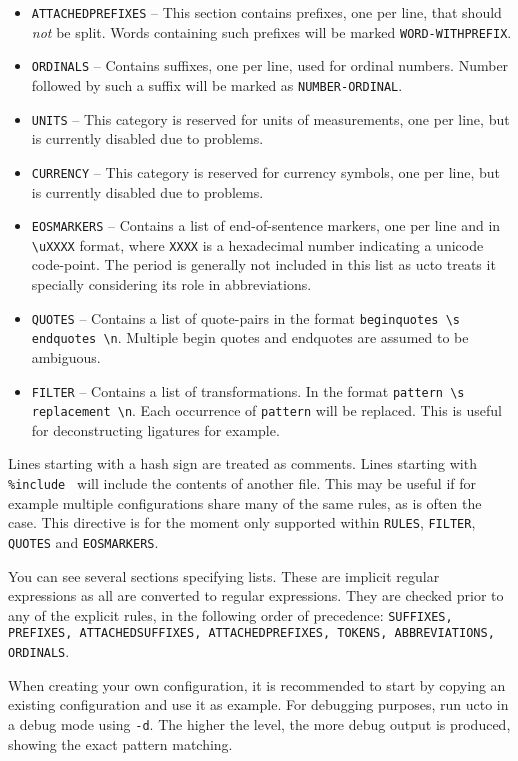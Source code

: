 \documentclass[a4paper,12pt]{report}
\begin{document}
\begin{itemize}
\item \texttt{ATTACHEDPREFIXES} -- This section contains prefixes, one per line, that should \emph{not} be split. Words containing such prefixes will be marked \texttt{WORD-WITHPREFIX}.
\item \texttt{ORDINALS} -- Contains suffixes, one per line, used for ordinal numbers. Number followed by such a suffix will be marked as \texttt{NUMBER-ORDINAL}.
\item \texttt{UNITS} -- This category is reserved for units of measurements, one per line, but is currently disabled due to problems.
\item \texttt{CURRENCY} -- This category is reserved for currency symbols, one per line, but is currently disabled due to problems.
\item \texttt{EOSMARKERS} -- Contains a list of end-of-sentence markers, one per line and in \texttt{{\textbackslash}uXXXX} format, where \texttt{XXXX} is a hexadecimal number indicating a unicode code-point. The period is generally not included in this list as ucto treats it specially considering its role in abbreviations.
\item \texttt{QUOTES} -- Contains a list of quote-pairs in the format \texttt{beginquotes {\textbackslash}s endquotes {\textbackslash}n}. Multiple begin quotes and endquotes are assumed to be ambiguous.
\item \texttt{FILTER} -- Contains a list of transformations. In the format \texttt{pattern {\textbackslash}s replacement {\textbackslash}n}. Each occurrence of \texttt{pattern} will be replaced. This is useful for deconstructing ligatures for example. 
\end{itemize}

Lines starting with a hash sign are treated as comments. Lines starting with \texttt{\%include } will include the contents of another file. This may be useful if for example multiple configurations share many of the same rules, as is often the case.  This directive is for the moment only supported within \texttt{RULES}, \texttt{FILTER}, \texttt{QUOTES} and \texttt{EOSMARKERS}.

You can see several sections specifying lists. These are implicit regular expressions as all are converted to regular expressions. They are checked prior to any of the explicit rules, in the following order of precedence: \texttt{SUFFIXES, PREFIXES, ATTACHEDSUFFIXES, ATTACHEDPREFIXES, TOKENS, ABBREVIATIONS, ORDINALS}.

When creating your own configuration, it is recommended to start by copying an existing configuration and use it as example. For debugging purposes, run ucto in a debug mode using \texttt{-d}. The higher the level, the more debug output is produced, showing the exact pattern matching.
\end{document}
